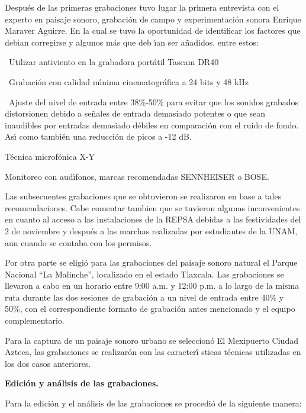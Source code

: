 Despu\'{e}s de las primeras grabaciones tuvo lugar la primera entrevista con
el experto en paisaje sonoro, grabaci\'{o}n de campo y experimentaci\'{o}n
sonora Enrique Maraver Aguirre. En la cual se tuvo la oportunidad de
identificar los factores que deb\'{\i}an corregirse y algunos m\'{a}s que deb%
\'{\i}an ser a\~{n}adidos, entre estos:

\textbullet\ Utilizar antiviento en la grabadora port\'{a}til Tascam DR40

\textbullet\ Grabaci\'{o}n con calidad m\'{\i}nima cinematogr\'{a}fica a 24
bits y 48 kHz

\bigskip \textbullet\ Ajuste del nivel de entrada entre 38\%-50\% para
evitar que los sonidos grabados distorsionen debido a se\~{n}ales de entrada
demasiado potentes o que sean inaudibles por entradas demasiado d\'{e}biles
en comparaci\'{o}n con el ruido de fondo. As\'{\i} como tambi\'{e}n una
reducci\'{o}n de picos a -12 dB.

\qquad\textbullet\qquad T\'{e}cnica microf\'{o}nica X-Y

\qquad \textbullet \qquad Monitoreo con aud\'{\i}fonos, marcas recomendadas
SENNHEISER o BOSE.

Las subsecuentes grabaciones que se obtuvieron se realizaron en base a tales
recomendaciones. Cabe comentar tambien que se tuvieron algunas
inconvenientes en cuanto al acceso a las instalaciones de la REPSA debidas a
las festividades del 2 de noviembre y despu\'{e}s a las marchas realizadas
por estudiantes de la UNAM, aun cuando se contaba con los permisos.

Por otra parte se eligi\'{o} para las grabaciones del paisaje sonoro natural
el Parque Nacional \textquotedblleft La Malinche\textquotedblright,
localizado en el estado Tlaxcala. Las grabaciones se llevaron a cabo en un
horario entre 9:00 a.m. y 12:00 p.m. a lo largo de la misma ruta durante las
dos sesiones de grabaci\'{o}n a un nivel de entrada entre 40\% y 50\%, con
el correspondiente formato de grabaci\'{o}n antes mencionado y el equipo
complementario.

Para la captura de un paisaje sonoro urbano se seleccion\'{o} El Mexipuerto
Ciudad Azteca, las grabaciones se realizar\'{o}n con las caracter\'{\i}%
sticas t\'{e}cnicas utilizadas en los dos casos anteriores.

\textbf{ Edici\'{o}n y an\'{a}lisis de las grabaciones.}

Para la edici\'{o}n y el an\'{a}lisis de las grabaciones se procedi\'{o} de
la siguiente manera:

